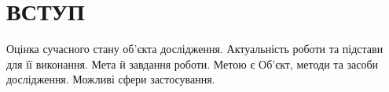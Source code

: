 \chapter*{ВСТУП}

Оцінка сучасного стану об’єкта дослідження.
Актуальність роботи та підстави для її виконання.
Мета й завдання роботи. Метою є
Об'єкт, методи та засоби дослідження.
Можливі сфери застосування.

